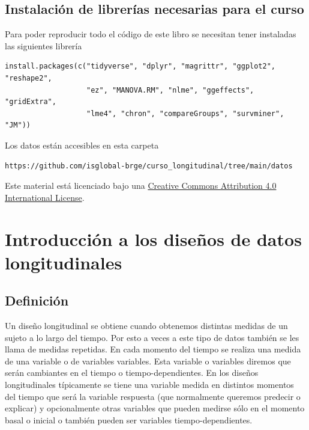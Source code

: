 \documentclass[
]{book}
\begin{document}
\hypertarget{instalaciuxf3n-de-libreruxedas-necesarias-para-el-curso}{%
\section{Instalación de librerías necesarias para el curso}\label{instalaciuxf3n-de-libreruxedas-necesarias-para-el-curso}}

Para poder reproducir todo el código de este libro se necesitan tener instaladas las siguientes librería

\begin{verbatim}
install.packages(c("tidyverse", "dplyr", "magrittr", "ggplot2", "reshape2",
                   "ez", "MANOVA.RM", "nlme", "ggeffects", "gridExtra",
                   "lme4", "chron", "compareGroups", "survminer", "JM"))
\end{verbatim}

Los datos están accesibles en esta carpeta

\begin{verbatim}
https://github.com/isglobal-brge/curso_longitudinal/tree/main/datos
\end{verbatim}

Este material está licenciado bajo una \href{https://creativecommons.org/licenses/by/4.0/}{Creative Commons Attribution 4.0 International License}.

\hypertarget{intro}{%
\chapter{Introducción a los diseños de datos longitudinales}\label{intro}}

\hypertarget{definiciuxf3n}{%
\section{Definición}\label{definiciuxf3n}}

Un diseño longitudinal se obtiene cuando obtenemos distintas medidas de un sujeto a lo largo del tiempo. Por esto a veces a este tipo de datos también se les llama de medidas repetidas. En cada momento del tiempo se realiza una medida de una variable o de variables variables. Esta variable o variables diremos que serán cambiantes en el tiempo o tiempo-dependientes. En los diseños longitudinales típicamente se tiene una variable medida en distintos momentos del tiempo que será la variable respuesta (que normalmente queremos predecir o explicar) y opcionalmente otras variables que pueden medirse sólo en el momento basal o inicial o también pueden ser variables tiempo-dependientes.
\end{document}
